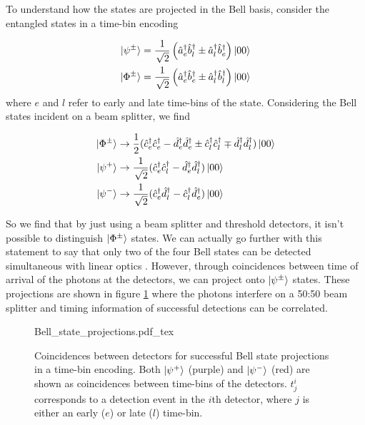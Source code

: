 To understand how the states are projected in the Bell basis, consider the entangled states in a time-bin encoding 

\begin{align}
	\ket{\psi^\pm} &= \frac{1}{\sqrt{2}}\left(\hat{a}^\dagger_e \hat{b}^\dagger_l \pm \hat{a}^\dagger_l \hat{b}^\dagger_e\right)\ket{00}\\
	\ket{\Phi^\pm} &= \frac{1}{\sqrt{2}}\left(\hat{a}^\dagger_e \hat{b}^\dagger_e \pm \hat{a}^\dagger_l \hat{b}^\dagger_l\right)\ket{00}
\end{align}
where $e$ and $l$ refer to early and late time-bins of the state. Considering the Bell states incident on a beam splitter, we find

\begin{align}
	\ket{\Phi^\pm} &\rightarrow \frac{1}{2}(\hat{c}^\dagger_e \hat{c}^\dagger_e - \hat{d}^\dagger_e \hat{d}^\dagger_e \pm \hat{c}^\dagger_l \hat{c}^\dagger_l \mp \hat{d}^\dagger_l \hat{d}^\dagger_l)\ket{00}\\
	\ket{\psi^+} &\rightarrow \frac{1}{\sqrt{2}}(\hat{c}^\dagger_e \hat{c}^\dagger_l - \hat{d}^\dagger_e \hat{d}^\dagger_l) \ket{00}\\
	\ket{\psi^-} &\rightarrow \frac{1}{\sqrt{2}}(\hat{c}^\dagger_e \hat{d}^\dagger_l - \hat{c}^\dagger_l \hat{d}^\dagger_e) \ket{00}
\end{align}

So we find that by just using a beam splitter and threshold detectors, it isn't possible to distinguish $\ket{\Phi^\pm}$ states. We can actually go further with this statement to say that only two of the four Bell states can be detected simultaneous with linear optics \cite{walborn2003, Mattle1996}. However, through coincidences between time of arrival of the photons at the detectors, we can project onto $\ket{\psi^\pm}$ states. These projections are shown in figure \ref{fig:bell_state_projections} where the photons interfere on a {50:50} beam splitter and timing information of successful detections can be correlated.

\begin{figure}[tp]
	\centering
	\Large
	\def\svgwidth{0.7\textwidth} 
	{Bell_state_projections.pdf_tex}
	\caption[Bell state projections for time-bin encoding]{Coincidences between detectors for successful Bell state projections in a time-bin encoding. Both $\ket{	\psi^+}$ (purple) and $\ket{\psi^-}$ (red) are shown as coincidences between time-bins of the detectors. $t^i_j$ corresponds to a detection event in the $i$th detector, where $j$ is either an early ($e$) or late ($l$) time-bin. }
	\label{fig:bell_state_projections}
\end{figure}

